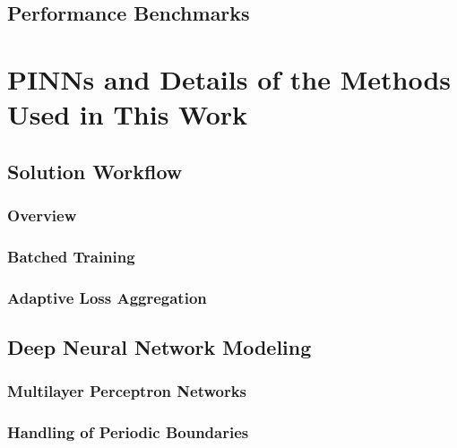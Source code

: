 \documentclass[font=STIX2]{gw-dissertation}[2021/11/19]
\begin{document}
    \section{Performance Benchmarks}\label{sec:petibm-perf}
    

\chapter{PINNs and Details of the Methods Used in This Work}\label{chap:pinn}

    \section{Solution Workflow}\label{sec:pinn-workflow-overview}

        \subsection{Overview}\label{sec:pinn-overview}
        

        \subsection{Batched Training}\label{sec:batched-training}
        

        \subsection{Adaptive Loss Aggregation}\label{sec:loss-annealing}
        

    \section{Deep Neural Network Modeling}\label{sec:pinn-dnnm}

        \subsection{Multilayer Perceptron Networks}\label{sec:mlp}
        

        \subsection{Handling of Periodic Boundaries}\label{sec:periodic-boundary}
        
\end{document}
